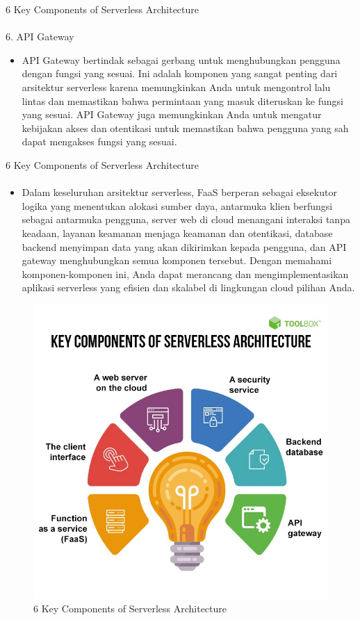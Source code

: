 \documentclass[aspectratio=169, table]{beamer}
\begin{document}
	\begin{frame}{6 Key Components of Serverless Architecture}
			\framesubtitle{\hspace{1cm}}
		6. API Gateway
		\begin{itemize}
			\item API Gateway bertindak sebagai gerbang untuk menghubungkan pengguna dengan fungsi yang sesuai. 
			Ini adalah komponen yang sangat penting dari arsitektur serverless karena memungkinkan Anda untuk mengontrol lalu lintas dan memastikan bahwa permintaan yang masuk diteruskan ke fungsi yang sesuai. 
			API Gateway juga memungkinkan Anda untuk mengatur kebijakan akses dan otentikasi untuk memastikan bahwa pengguna yang sah dapat mengakses fungsi yang sesuai.
		\end{itemize}
	\end{frame}
	
	\begin{frame}{6 Key Components of Serverless Architecture}
		\framesubtitle{\hspace{1cm}}
		\begin{itemize}
			\item Dalam keseluruhan arsitektur serverless, FaaS berperan sebagai eksekutor logika yang menentukan alokasi sumber daya, antarmuka klien berfungsi sebagai antarmuka pengguna, server web di cloud menangani interaksi tanpa keadaan, layanan keamanan menjaga keamanan dan otentikasi, database backend menyimpan data yang akan dikirimkan kepada pengguna, dan API gateway menghubungkan semua komponen tersebut. 
			Dengan memahami komponen-komponen ini, Anda dapat merancang dan mengimplementasikan aplikasi serverless yang efisien dan skalabel di lingkungan cloud pilihan Anda.
		\end{itemize}
	\end{frame}
	\begin{frame}
		\begin{figure}
			\includegraphics[width=0.5\linewidth]{komponen.jpg}
			\centering
			\caption{6 Key Components of Serverless Architecture}
		\end{figure}
	\end{frame}
	
\end{document}

